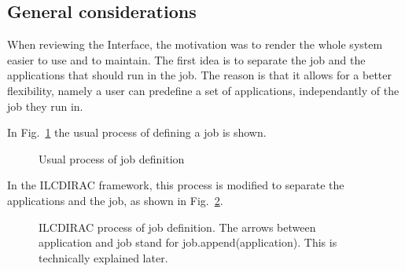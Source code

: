 \documentclass[a4paper,12pt]{article}
\begin{document}
\subsection{General considerations}
When reviewing the Interface, the motivation was to render the whole system
easier to use and to maintain. The first idea is to separate the job and the
applications that should run in the job. The reason is that it allows for a
better flexibility, namely a user can predefine a set of applications,
independantly of the job they run in.

In Fig.~\ref{fig:defdefinejob} the usual process of defining a job is shown. 
\begin{figure}[h]
\begin{center}
\end{center}
\caption{Usual process of job definition}
\label{fig:defdefinejob}
\end{figure}
In the ILCDIRAC framework, this process is modified to separate the applications
and the job, as shown in Fig.~\ref{fig:definejob}.
\begin{figure}[h]
\begin{center}
\end{center}
\caption{ILCDIRAC process of job definition. The arrows between application and
job stand for job.append(application). This is
technically explained later.}
\label{fig:definejob}
\end{figure}
\end{document}
